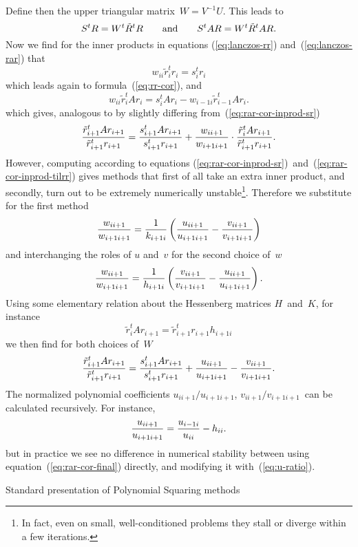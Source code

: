 Define then the upper triangular matrix~$W=V^{-1}U$.
This leads to
	\[ S^tR=W^t\tilde R^tR\qquad\hbox{and}\qquad
		S^tAR=W^t\tilde R^tAR. \]
Now we find for the inner products in equations
(\ref{eq:lanczos-rr}) and~(\ref{eq:lanczos-rar}) that
	\[ w_{ii}\tilde r_i^tr_i = s_i^tr_i \]
which leads again to formula~(\ref{eq:rr-cor}), and
	\[ w_{ii}\tilde r_i^tAr_i =
		s_i^tAr_i-w_{i-1i}\tilde r_{i-1}^tAr_i. \]
which gives, analogous to by slightly differing
from~(\ref{eq:rar-cor-inprod-sr}) 
\begin{equation}
	{\tilde r_{i+1}^tAr_{i+1}\over \tilde r_{i+1}^tr_{i+1}}=
		{s_{i+1}^tAr_{i+1}\over s_{i+1}^tr_{i+1}}+
		{w_{ii+1}\over w_{i+1i+1}}\cdot
		{\tilde r_{i}^tAr_{i+1}\over \tilde r_{i+1}^tr_{i+1}}.
	\label{eq:rar-cor-inprod-tilrr}\end{equation}
However, computing according to equations
(\ref{eq:rar-cor-inprod-sr})~and~(\ref{eq:rar-cor-inprod-tilrr}) gives
methods that first of all take an extra inner product, and secondly,
turn out to be  extremely numerically unstable\footnote
{In fact, even on small, well-conditioned problems
they stall or diverge within a few iterations.}.
Therefore we
substitute for the first method
	\[	{w_{ii+1}\over w_{i+1i+1}}=
		{1\over k_{i+1i}}\left(
		{u_{ii+1}\over u_{i+1i+1}}-{v_{ii+1}\over v_{i+1i+1}}
		\right) \]
and interchanging the roles of $u$ and~$v$ for the second choice of~$w$
	\[ {w_{ii+1}\over w_{i+1i+1}}=
		{1\over h_{i+1i}}\left(
		{v_{ii+1}\over v_{i+1i+1}}-{u_{ii+1}\over u_{i+1i+1}}
		\right). \]
Using some elementary relation about the Hessenberg matrices
$H$~and~$K$, for instance
\[ \tilde r_i^tAr_{i+1}=\tilde r_{i+1}^tr_{i+1}h_{i+1i} \]
we then find for both choices of~$W$
\begin{equation}
	{\tilde r_{i+1}^tAr_{i+1}\over \tilde r_{i+1}^tr_{i+1}}=
		{s_{i+1}^tAr_{i+1}\over s_{i+1}^tr_{i+1}}+
		{u_{ii+1}\over u_{i+1i+1}}-{v_{ii+1}\over v_{i+1i+1}}.
	\label{eq:rar-cor-final}\end{equation}
The normalized polynomial coefficients $u_{ii+1}/u_{i+1i+1}$,
$v_{ii+1}/v_{i+1i+1}$~can be calculated recursively. For instance,
	\begin{equation}
		{u_{ii+1}\over u_{i+1i+1}}={u_{i-1i}\over u_{ii}}
		-h_{ii}.
	\label{eq:u-ratio}\end{equation}
but in practice we see no difference in numerical stability between
using equation~(\ref{eq:rar-cor-final}) directly, and modifying it
with~(\ref{eq:u-ratio}).

 {Standard presentation of Polynomial Squaring methods}
\label{sec:cgs-2term}

